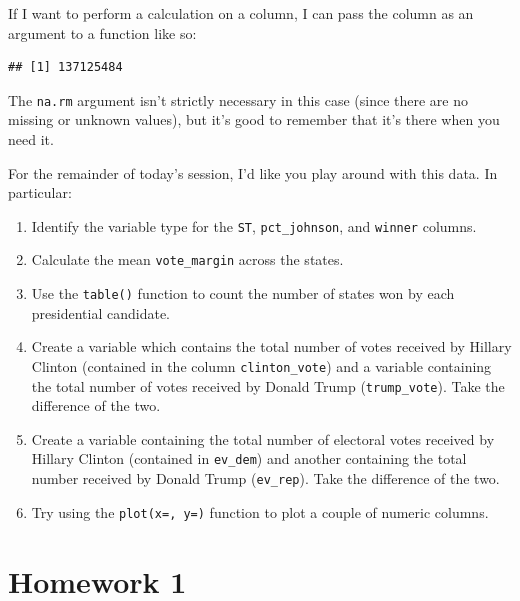 \documentclass[
]{book}
\newenvironment{Shaded}{\begin{snugshade}}{\end{snugshade}}
\newcommand{\AttributeTok}[1]{\textcolor[rgb]{0.13,0.29,0.53}{#1}}
\newcommand{\CommentTok}[1]{\textcolor[rgb]{0.56,0.35,0.01}{\textit{#1}}}
\newcommand{\ConstantTok}[1]{\textcolor[rgb]{0.56,0.35,0.01}{#1}}
\newcommand{\FunctionTok}[1]{\textcolor[rgb]{0.13,0.29,0.53}{\textbf{#1}}}
\newcommand{\NormalTok}[1]{#1}
\newcommand{\SpecialCharTok}[1]{\textcolor[rgb]{0.81,0.36,0.00}{\textbf{#1}}}
\providecommand{\tightlist}{%
  \setlength{\itemsep}{0pt}\setlength{\parskip}{0pt}}
\begin{document}
If I want to perform a calculation on a column, I can pass the column as an argument to a function like so:

\begin{Shaded}
\end{Shaded}

\begin{verbatim}
## [1] 137125484
\end{verbatim}

The \texttt{na.rm} argument isn't strictly necessary in this case (since there are no missing or unknown values), but it's good to remember that it's there when you need it.

For the remainder of today's session, I'd like you play around with this data. In particular:

\begin{enumerate}
\def\labelenumi{\arabic{enumi}.}
\tightlist
\item
  Identify the variable type for the \texttt{ST}, \texttt{pct\_johnson}, and \texttt{winner} columns.
\item
  Calculate the mean \texttt{vote\_margin} across the states.
\item
  Use the \texttt{table()} function to count the number of states won by each presidential candidate.
\item
  Create a variable which contains the total number of votes received by Hillary Clinton (contained in the column \texttt{clinton\_vote}) and a variable containing the total number of votes received by Donald Trump (\texttt{trump\_vote}). Take the difference of the two.
\item
  Create a variable containing the total number of electoral votes received by Hillary Clinton (contained in \texttt{ev\_dem}) and another containing the total number received by Donald Trump (\texttt{ev\_rep}). Take the difference of the two.
\item
  Try using the \texttt{plot(x=,\ y=)} function to plot a couple of numeric columns.
\end{enumerate}

\hypertarget{homework-1}{%
\chapter*{Homework 1}\label{homework-1}}
\end{document}
